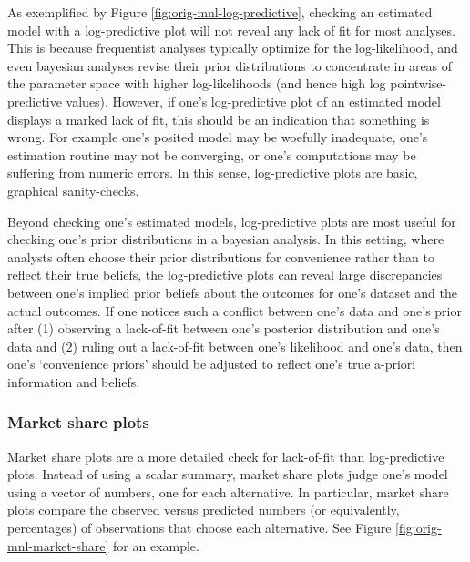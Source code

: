 \documentclass[preprint]{elsarticle}
\begin{document}
As exemplified by Figure \ref{fig:orig-mnl-log-predictive}, checking an estimated model with a log-predictive plot will not reveal any lack of fit for most analyses. This is because frequentist analyses typically optimize for the log-likelihood, and even bayesian analyses revise their prior distributions to concentrate in areas of the parameter space with higher log-likelihoods (and hence high log pointwise-predictive values). However, if one's log-predictive plot of an estimated model displays a marked lack of fit, this should be an indication that something is wrong. For example one's posited model may be woefully inadequate, one's estimation routine may not be converging, or one's computations may be suffering from numeric errors. In this sense, log-predictive plots are basic, graphical sanity-checks.

Beyond checking one's estimated models, log-predictive plots are most useful for checking one's prior distributions in a bayesian analysis. In this setting, where analysts often choose their prior distributions for convenience rather than to reflect their true beliefs, the log-predictive plots can reveal large discrepancies between one's implied prior beliefs about the outcomes for one's dataset and the actual outcomes. If one notices such a conflict between one's data and one's prior after (1) observing a lack-of-fit between one's posterior distribution and one's data and (2) ruling out a lack-of-fit between one's likelihood and one's data, then one's `convenience priors' should be adjusted to reflect one's true a-priori information and beliefs.

\subsubsection{Market share plots}
\label{sec:case1-part1-ms-plots}
Market share plots are a more detailed check for lack-of-fit than log-predictive plots. Instead of using a scalar summary, market share plots judge one's model using a vector of numbers, one for each alternative. In particular, market share plots compare the observed versus predicted numbers (or equivalently, percentages) of observations that choose each alternative. See Figure \ref{fig:orig-mnl-market-share} for an example.
\end{document}
